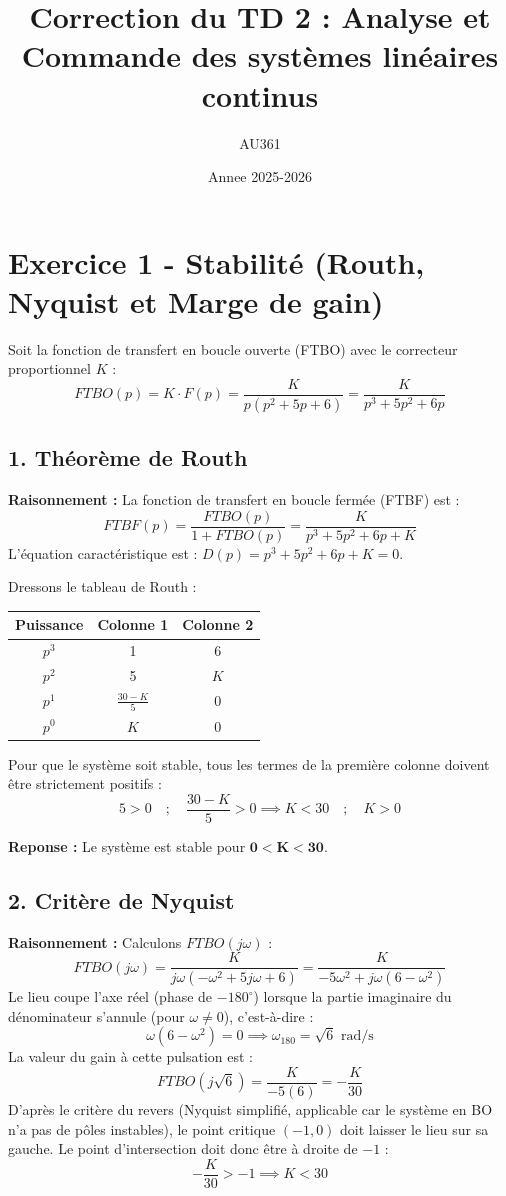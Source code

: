 \documentclass[11pt,a4paper]{article}
\title{Correction du TD 2 : Analyse et Commande des systèmes linéaires continus}
\author{AU361}
\date{Annee 2025-2026}
\begin{document}
\maketitle

\section*{Exercice 1 - Stabilité (Routh, Nyquist et Marge de gain)}

Soit la fonction de transfert en boucle ouverte (FTBO) avec le correcteur proportionnel $K$ : 
$$ FTBO(p) = K \cdot F(p) = \frac{K}{p(p^2+5p+6)} = \frac{K}{p^3+5p^2+6p} $$

\subsection*{1. Théorème de Routh}

\textbf{Raisonnement :} La fonction de transfert en boucle fermée (FTBF) est :
$$ FTBF(p) = \frac{FTBO(p)}{1+FTBO(p)} = \frac{K}{p^3+5p^2+6p+K} $$
L'équation caractéristique est : $D(p) = p^3 + 5p^2 + 6p + K = 0$.

Dressons le tableau de Routh :
\begin{table}[h!]
    \centering
    \begin{tabular}{ccc}
        \toprule
        \textbf{Puissance} & \textbf{Colonne 1} & \textbf{Colonne 2} \\
        \midrule
        $p^3$ & 1 & 6 \\
        $p^2$ & 5 & $K$ \\
        $p^1$ & $\frac{30-K}{5}$ & 0 \\
        $p^0$ & $K$ & 0 \\
        \bottomrule
    \end{tabular}
\end{table}

Pour que le système soit stable, tous les termes de la première colonne doivent être strictement positifs :
$$ 5 > 0 \quad ; \quad \frac{30-K}{5} > 0 \implies K < 30 \quad ; \quad K > 0 $$

\textbf{Reponse :} Le système est stable pour $\mathbf{0 < K < 30}$.

\subsection*{2. Critère de Nyquist}

\textbf{Raisonnement :} Calculons $FTBO(j\omega)$ :
$$ FTBO(j\omega) = \frac{K}{j\omega(-\omega^2+5j\omega+6)} = \frac{K}{-5\omega^2 + j\omega(6-\omega^2)} $$
Le lieu coupe l'axe réel (phase de $-180^\circ$) lorsque la partie imaginaire du dénominateur s'annule (pour $\omega \neq 0$), c'est-à-dire :
$$ \omega(6-\omega^2) = 0 \implies \omega_{180} = \sqrt{6} \text{ rad/s} $$
La valeur du gain à cette pulsation est :
$$ FTBO(j\sqrt{6}) = \frac{K}{-5(6)} = -\frac{K}{30} $$
D'après le critère du revers (Nyquist simplifié, applicable car le système en BO n'a pas de pôles instables), le point critique $(-1, 0)$ doit laisser le lieu sur sa gauche.
Le point d'intersection doit donc être à droite de $-1$ :
$$ -\frac{K}{30} > -1 \implies K < 30 $$
\end{document}
